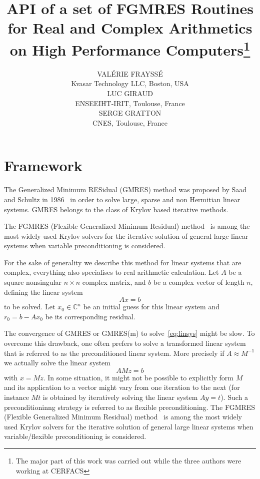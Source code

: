 \documentclass{acmtrans2m}
\title{API of a set of FGMRES Routines for Real and Complex Arithmetics on High Performance Computers\footnote{The major part of this work was carried out while the three authors
     were working at CERFACS}}
\author{VAL\'ERIE FRAYSS\'E\\{Kvasar Technology LLC, Boston, USA} \\
LUC GIRAUD\\{ENSEEIHT-IRIT, Toulouse, France}\\
SERGE GRATTON\\{CNES, Toulouse, France}
}
\date{}
\begin{document}
\maketitle

%
%
\section{Framework}

The Generalized Minimum RESidual (GMRES) method was proposed by Saad
and Schultz in 1986~\cite{SAA.SCH.86} in order  to solve
large, sparse and non Hermitian linear systems.
GMRES belongs to the class of Krylov based iterative methods.

The FGMRES (Flexible Generalized Minimum Residual) method~\cite{SAA.93} is among the
most widely used Krylov solvers for the iterative solution of general large
linear systems when variable preconditioning is considered.


For the sake of generality we  describe this method for linear
systems that are complex, everything also specialises to real
arithmetic calculation.
Let $A$ be a square nonsingular $n \times n$ complex matrix, and $b$ be
a complex vector of length $n$, defining the linear system
\begin{equation}
A x = b
\label{eq:linsys}
\end{equation}
to be solved.
Let $x_0 \in \mathbb{C}^n$ be an initial guess for this linear system and
$r_0 = b - Ax_0$ be its corresponding residual.

  The convergence of GMRES or GMRES(m) to solve~\eqref{eq:linsys} might be slow.
To overcome this drawback, one often prefers to solve
a transformed linear system that is referred to as the
preconditioned linear system. 
More precisely if $A \approx M^{-1}$ we
actually solve the linear system
\begin{equation}
A M z =  b
\label{eq:preclinsys} 
\end{equation}
with $x = M z$.
In some situation, it might not be possible to explicitly
form $M$ and its application to a vector might vary from
one iteration to the next (for instance $M t$ is obtained
by iteratively solving the linear system $A y = t$).
 Such a preconditioninng strategy is referred to as flexible 
preconditioning.
The FGMRES (Flexible Generalized Minimum Residual) method~\cite{SAA.93} is among the
most widely used Krylov solvers for the iterative solution of general large
linear systems when variable/flexible preconditioning is considered.
\end{document}
